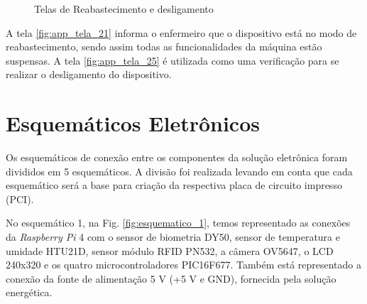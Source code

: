 \begin{apendicesenv}
\begin{figure}[H]
    \centering
    \caption{Telas de Reabastecimento e desligamento }\label{fig:telas_21_25}
\end{figure}

A tela \ref{fig:app_tela_21} informa o enfermeiro que o dispositivo está no modo de reabastecimento, sendo assim todas as funcionalidades da máquina estão suspensas. A tela \ref{fig:app_tela_25} é utilizada como uma verificação para se realizar o desligamento do dispositivo.

\chapter{Esquemáticos Eletrônicos}\label{esquematicos_eletronica}

Os esquemáticos de conexão entre os componentes da solução eletrônica foram divididos em 5 esquemáticos. A divisão foi realizada levando em conta que cada esquemático será a base para criação da respectiva placa de circuito impresso (PCI).

No esquemático 1, na Fig. \ref{fig:esquematico_1}, temos representado as conexões da \textit{Raspberry Pi} 4 com o sensor de biometria DY50, sensor de temperatura e umidade HTU21D, sensor módulo RFID PN532, a câmera OV5647, o LCD 240x320 e os quatro microcontroladores PIC16F677. Também está representado a conexão da fonte de alimentação 5 V (+5 V e GND), fornecida pela solução energética. 


\end{apendicesenv}
